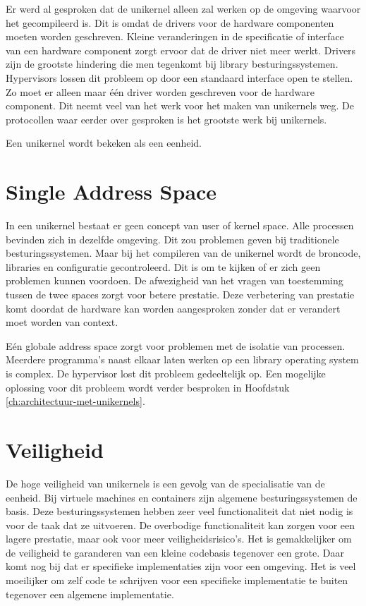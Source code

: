 \documentclass[pdftex,a4paper,12pt,twoside]{report}
\begin{document}
Er werd al gesproken dat de unikernel alleen zal werken op de omgeving waarvoor het gecompileerd is. Dit is omdat de drivers voor de hardware componenten moeten worden geschreven. Kleine veranderingen in de specificatie of interface van een hardware component zorgt ervoor dat de driver niet meer werkt. Drivers zijn de grootste hindering die men tegenkomt bij library besturingssystemen. Hypervisors lossen dit probleem op door een standaard interface open te stellen. Zo moet er alleen maar één driver worden geschreven voor de hardware component. Dit neemt veel van het werk voor het maken van unikernels weg. De protocollen waar eerder over gesproken is het grootste werk bij unikernels.

Een unikernel wordt bekeken als een eenheid.

\section{Single Address Space}

In een unikernel bestaat er geen concept van user of kernel space. Alle processen bevinden zich in dezelfde omgeving. Dit zou problemen geven bij traditionele besturingssystemen. Maar bij het compileren van de unikernel wordt de broncode, libraries en configuratie gecontroleerd. Dit is om te kijken of er zich geen problemen kunnen voordoen. De afwezigheid van het vragen van toestemming tussen de twee spaces zorgt voor betere prestatie. Deze verbetering van prestatie komt doordat de hardware kan worden aangesproken zonder dat er verandert moet worden van context.

Eén globale address space zorgt voor problemen met de isolatie van processen. Meerdere programma's naast elkaar laten werken op een library operating system is complex. De hypervisor lost dit probleem gedeeltelijk op. Een mogelijke oplossing voor dit probleem wordt verder besproken in Hoofdstuk \ref{ch:architectuur-met-unikernels}.

\section{Veiligheid}

De hoge veiligheid van unikernels is een gevolg van de specialisatie van de eenheid. Bij virtuele machines en containers zijn algemene besturingssystemen de basis. Deze besturingssystemen hebben zeer veel functionaliteit dat niet nodig is voor de taak dat ze uitvoeren. De overbodige functionaliteit kan zorgen voor een lagere prestatie, maar ook voor meer veiligheidsrisico's. Het is gemakkelijker om de veiligheid te garanderen van een kleine codebasis tegenover een grote. Daar komt nog bij dat er specifieke implementaties zijn voor een omgeving. Het is veel moeilijker om zelf code te schrijven voor een specifieke implementatie te buiten tegenover een algemene implementatie.
\end{document}
